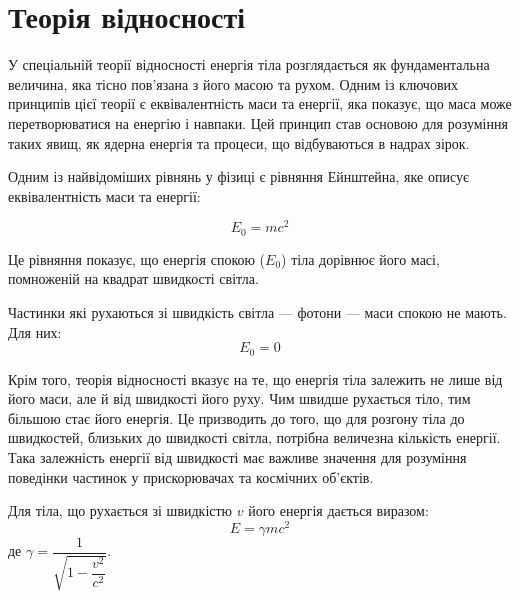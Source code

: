 
\maketitle

\section{Теорія відносності}

У спеціальній теорії відносності енергія тіла розглядається як фундаментальна величина, яка тісно
пов'язана з його масою та рухом. Одним із ключових принципів цієї теорії є еквівалентність маси та
енергії, яка показує, що маса може перетворюватися на енергію і навпаки. Цей принцип став основою для
розуміння таких явищ, як ядерна енергія та процеси, що відбуваються в надрах зірок.

\begin{Example}\label{ex:einstein}
	Одним із найвідоміших рівнянь у фізиці є рівняння Ейнштейна, яке описує еквівалентність маси та
	енергії:

	\begin{equation}\label{eq:einstein}
		E_0 = mc^2
	\end{equation}

	Це рівняння показує, що енергія спокою ($E_0$) тіла дорівнює його масі, помноженій на квадрат
	швидкості світла.

    Частинки які рухаються зі швидкість світла --- фотони --- маси спокою не мають. Для них:
    \begin{equation}
        E_0 = 0
    \end{equation}

\end{Example}

Крім того, теорія відносності вказує на те, що енергія тіла залежить не лише від його маси, але й від
швидкості його руху. Чим швидше рухається тіло, тим більшою стає його енергія. Це призводить до того,
що для розгону тіла до швидкостей, близьких до швидкості світла, потрібна величезна кількість
енергії. Така залежність енергії від швидкості має важливе значення для розуміння поведінки частинок
у прискорювачах та космічних об'єктів.



\begin{Example}\label{ex:einstein2}
	Для тіла, що рухається зі швидкістю $v$ його енергія дається виразом:
	\begin{equation}\label{eq:einstein2}
		E = \gamma mc^2
	\end{equation}
де $\gamma = \dfrac1{\sqrt{1-\dfrac{v^2}{c^2}}}$.
\end{Example}

